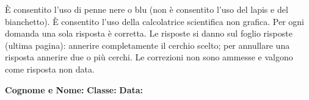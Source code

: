 \documentclass[a4paper,10pt]{exam}
\begin{document}
\begin{tcolorbox}[istruzionibox]
È consentito l'uso di penne nere o blu (non è consentito l'uso del lapis e del bianchetto).
È consentito l'uso della calcolatrice scientifica non grafica.
Per ogni domanda una sola risposta è corretta. Le risposte si danno sul foglio risposte (ultima pagina): annerire completamente il cerchio scelto; per annullare una risposta annerire due o più cerchi. Le correzioni non sono ammesse e valgono come risposta non data.
\end{tcolorbox}

\vspace{2mm}
\noindent
\textbf{Cognome e Nome:}\enspace\hrulefill\hspace{1cm}%
\textbf{Classe:}\enspace\makebox[2.5cm]{\hrulefill}\hspace{1cm}%
\textbf{Data:}\enspace\makebox[2.5cm]{\hrulefill}
\end{document}
